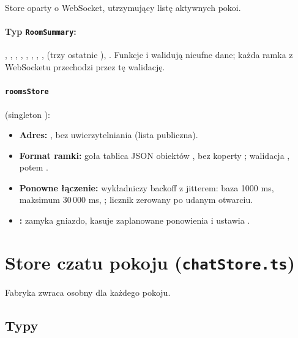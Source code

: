 Store oparty o WebSocket, utrzymujący listę aktywnych pokoi.

\paragraph{Typ \texttt{RoomSummary}:} , , ,
, , ,
, ,  (trzy ostatnie
), . Funkcje  i 
walidują nieufne dane; każda ramka z WebSocketu przechodzi przez tę walidację.

\paragraph{\texttt{roomsStore}} (singleton ):
\begin{itemize}[nosep]
  \item \textbf{Adres:} , bez uwierzytelniania (lista publiczna).
  \item \textbf{Format ramki:} goła tablica JSON obiektów , bez koperty
        ; walidacja , potem .
  \item \textbf{Ponowne łączenie:} wykładniczy backoff z jitterem: baza 1000 ms, maksimum 30\,000 ms,
        ; licznik zerowany po
        udanym otwarciu.
  \item \textbf{:} zamyka gniazdo, kasuje zaplanowane ponowienia i ustawia
        .
\end{itemize}

\section{Store czatu pokoju (\texttt{chatStore.ts})}\label{sec:fe-chatstore}

Fabryka  zwraca osobny 
dla każdego pokoju.

\subsection{Typy}

